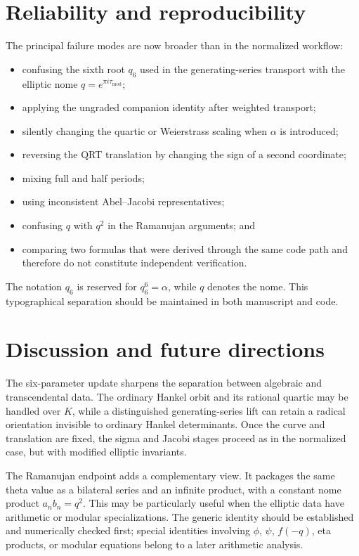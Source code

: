 \documentclass[11pt]{article}
\newcommand{\taumod}{\tau_{\mathrm{mod}}}
\begin{document}
\section{Reliability and reproducibility}
The principal failure modes are now broader than in the normalized workflow:
\begin{itemize}[leftmargin=2em]
 \item confusing the sixth root $q_6$ used in the generating-series transport
       with the elliptic nome $q=e^{\pi i\taumod}$;
 \item applying the ungraded companion identity after weighted transport;
 \item silently changing the quartic or Weierstrass scaling when $\alpha$ is
       introduced;
 \item reversing the QRT translation by changing the sign of a second
       coordinate;
 \item mixing full and half periods;
 \item using inconsistent Abel--Jacobi representatives;
 \item confusing $q$ with $q^2$ in the Ramanujan arguments; and
 \item comparing two formulas that were derived through the same code path
       and therefore do not constitute independent verification.
\end{itemize}
The notation $q_6$ is reserved for $q_6^6=\alpha$, while $q$ denotes the nome.
This typographical separation should be maintained in both manuscript and
code.

\section{Discussion and future directions}
The six-parameter update sharpens the separation between algebraic and
transcendental data.  The ordinary Hankel orbit and its rational quartic may be
handled over $K$, while a distinguished generating-series lift can retain a
radical orientation invisible to ordinary Hankel determinants.  Once the
curve and translation are fixed, the sigma and Jacobi stages proceed as in the
normalized case, but with modified elliptic invariants.

The Ramanujan endpoint adds a complementary view.  It packages the same theta
value as a bilateral series and an infinite product, with a constant nome
product $a_nb_n=q^2$.  This may be particularly useful when the elliptic data
have arithmetic or modular specializations.  The generic identity should be
established and numerically checked first; special identities involving
$\phi$, $\psi$, $f(-q)$, eta products, or modular equations belong to a later
arithmetic analysis.
\end{document}
